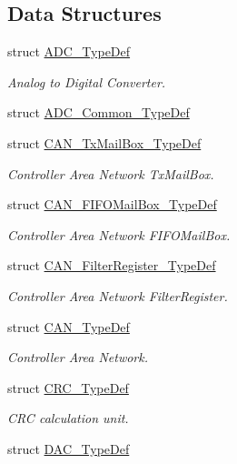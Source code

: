 \subsection*{Data Structures}
\begin{DoxyCompactItemize}
\item 
struct \hyperlink{struct_a_d_c___type_def}{A\+D\+C\+\_\+\+Type\+Def}
\begin{DoxyCompactList}\small\item\em Analog to Digital Converter. \end{DoxyCompactList}\item 
struct \hyperlink{struct_a_d_c___common___type_def}{A\+D\+C\+\_\+\+Common\+\_\+\+Type\+Def}
\item 
struct \hyperlink{struct_c_a_n___tx_mail_box___type_def}{C\+A\+N\+\_\+\+Tx\+Mail\+Box\+\_\+\+Type\+Def}
\begin{DoxyCompactList}\small\item\em Controller Area Network Tx\+Mail\+Box. \end{DoxyCompactList}\item 
struct \hyperlink{struct_c_a_n___f_i_f_o_mail_box___type_def}{C\+A\+N\+\_\+\+F\+I\+F\+O\+Mail\+Box\+\_\+\+Type\+Def}
\begin{DoxyCompactList}\small\item\em Controller Area Network F\+I\+F\+O\+Mail\+Box. \end{DoxyCompactList}\item 
struct \hyperlink{struct_c_a_n___filter_register___type_def}{C\+A\+N\+\_\+\+Filter\+Register\+\_\+\+Type\+Def}
\begin{DoxyCompactList}\small\item\em Controller Area Network Filter\+Register. \end{DoxyCompactList}\item 
struct \hyperlink{struct_c_a_n___type_def}{C\+A\+N\+\_\+\+Type\+Def}
\begin{DoxyCompactList}\small\item\em Controller Area Network. \end{DoxyCompactList}\item 
struct \hyperlink{struct_c_r_c___type_def}{C\+R\+C\+\_\+\+Type\+Def}
\begin{DoxyCompactList}\small\item\em C\+RC calculation unit. \end{DoxyCompactList}\item 
struct \hyperlink{struct_d_a_c___type_def}{D\+A\+C\+\_\+\+Type\+Def}

\end{DoxyCompactItemize}
